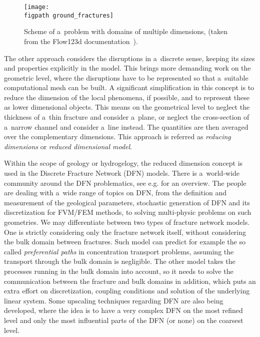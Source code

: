 \begin{figure}[!ht]
\centering
\texttt{[image: \\figpath ground\_fractures]}
\caption[Reduced dimensional model scheme.]{
    Scheme of a~problem with domains of multiple dimensions, (taken from the Flow123d documentation~\cite{flow123d_doc_2018}).}
\label{fig:multi-dim}
\end{figure}

% 

The other approach considers the disruptions in a~discrete sense, keeping its sizes and properties explicitly in the model.
This brings more demanding work on the geometric level, where the disruptions have to be represented so that a~suitable computational mesh can be built.
A significant simplification in this concept is to reduce the dimension of the local phenomena, if possible,
and to represent these as lower dimensional objects. This means on the geometrical level to neglect the thickness of a~thin fracture and consider a~plane, or
neglect the cross-section of a~narrow channel and consider a~line instead. The quantities are then averaged over the complementary dimensions.
This approach is referred as \emph{reducing dimensions} or \emph{reduced dimensional model}.

Within the scope of geology or hydrogelogy, the reduced dimension concept is used in the Discrete Fracture Network (DFN) models.
There is a~world-wide community around the DFN problematics, see e.g. \cite{jing_fundamentals_dfn_2007, lei_use_dfn_2017} for an overview.
The people are dealing with a~wide range of topics on DFN,
from the definition and measurement of the geological parameters, stochastic generation of DFN and its discretization for FVM/FEM methods,
to solving multi-physic problems on such geometries. We may differentiate between two types of fracture network models. One is strictly considering only
the fracture network itself, without considering the bulk domain between fractures. Such model can predict for example the so called \emph{preferential paths}
in concentration transport problems, assuming the transport through the bulk domain is negligible. The other model takes the processes running in the bulk domain
into account, so it needs to solve the communication between the fracture and bulk domains in addition, which puts an extra effort on discretization,
coupling conditions and solution of the underlying linear system.
Some upscaling techniques regarding DFN are also being developed, where the idea is to have a very complex DFN on the most refined level and only the most influential
parts of the DFN (or none) on the coarsest level.

